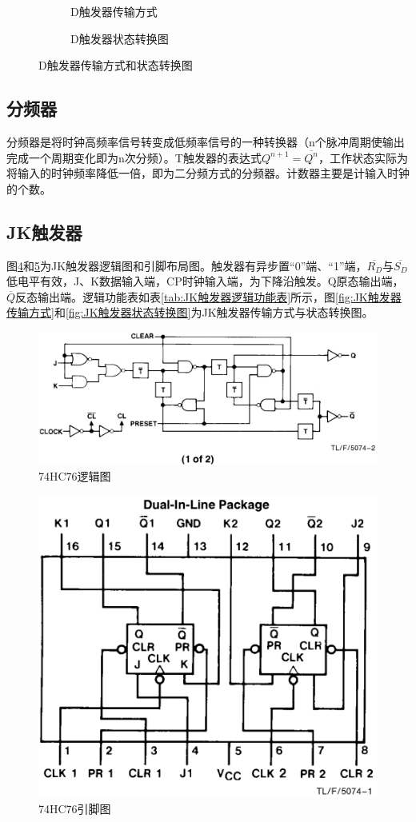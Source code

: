 \documentclass{ctexrep}
\begin{document}
\begin{figure}[htbp]
	\centering
	\begin{subfigure}[htbp]{.45\linewidth}
		\centering
		
		\caption{D触发器传输方式}
		\label{fig:D触发器传输方式}
	\end{subfigure}
	\quad
	\begin{subfigure}[htbp]{.45\linewidth}
		\centering
		
		\caption{D触发器状态转换图}
		\label{fig:D触发器状态转换图}
	\end{subfigure}
	\caption{D触发器传输方式和状态转换图}
	\label{fig:D触发器传输方式和状态转换图}
\end{figure}

\subsection{分频器}%
\label{sub:分频器}

分频器是将时钟高频率信号转变成低频率信号的一种转换器（n个脉冲周期使输出完成一个周期变化即为n次分频）。T触发器的表达式$Q^{n+1}=\overline{Q^n}$，工作状态实际为将输入的时钟频率降低一倍，即为二分频方式的分频器。计数器主要是计输入时钟的个数。

\subsection{JK触发器}%
\label{sub:JK触发器}
图\ref{fig:74HC76逻辑图}和\ref{fig:74HC76引脚图}为JK触发器逻辑图和引脚布局图。触发器有异步置“0”端、“1”端，$\overline{R_D}$与$\overline{S_D}$低电平有效，J、K数据输入端，CP时钟输入端，为下降沿触发。Q原态输出端，$\overline{Q}$反态输出端。逻辑功能表如表\ref{tab:JK触发器逻辑功能表}所示，图\ref{fig:JK触发器传输方式}和\ref{fig:JK触发器状态转换图}为JK触发器传输方式与状态转换图。

\begin{figure}[htbp]
	\centering
	\includegraphics[width=.8\linewidth]{74HC76001.png}
	\caption{74HC76逻辑图}
	\label{fig:74HC76逻辑图}
\end{figure}

\begin{figure}[htbp]
	\centering
	\includegraphics[width=.4\linewidth]{74HC76002.png}
	\caption{74HC76引脚图}
	\label{fig:74HC76引脚图}
\end{figure}
\end{document}
